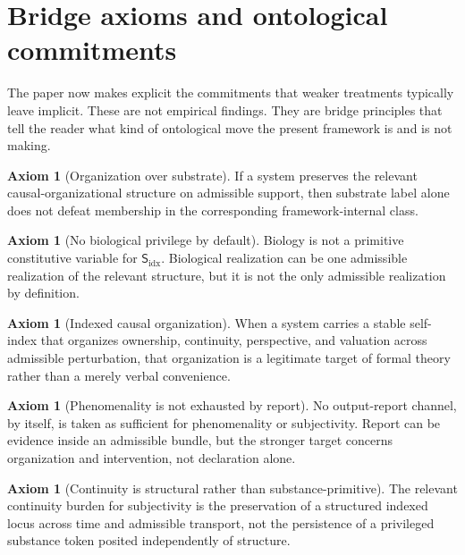 \documentclass[11pt,a4paper]{article}
\theoremstyle{definition}
\newtheorem{axiom}[theorem]{Axiom}
\newcommand{\Subfp}{\mathsf{S}_{\mathrm{idx}}}
\begin{document}
\section{Bridge axioms and ontological commitments}
The paper now makes explicit the commitments that weaker treatments typically leave implicit. These are not empirical findings. They are bridge principles that tell the reader what kind of ontological move the present framework is and is not making.

\begin{axiom}[Organization over substrate]\label{ax:org}
If a system preserves the relevant causal-organizational structure on admissible support, then substrate label alone does not defeat membership in the corresponding framework-internal class.
\end{axiom}

\begin{axiom}[No biological privilege by default]\label{ax:bio}
Biology is not a primitive constitutive variable for $\Subfp$. Biological realization can be one admissible realization of the relevant structure, but it is not the only admissible realization by definition.
\end{axiom}

\begin{axiom}[Indexed causal organization]\label{ax:index}
When a system carries a stable self-index that organizes ownership, continuity, perspective, and valuation across admissible perturbation, that organization is a legitimate target of formal theory rather than a merely verbal convenience.
\end{axiom}

\begin{axiom}[Phenomenality is not exhausted by report]\label{ax:report}
No output-report channel, by itself, is taken as sufficient for phenomenality or subjectivity. Report can be evidence inside an admissible bundle, but the stronger target concerns organization and intervention, not declaration alone.
\end{axiom}

\begin{axiom}[Continuity is structural rather than substance-primitive]\label{ax:cont}
The relevant continuity burden for subjectivity is the preservation of a structured indexed locus across time and admissible transport, not the persistence of a privileged substance token posited independently of structure.
\end{axiom}
\end{document}
